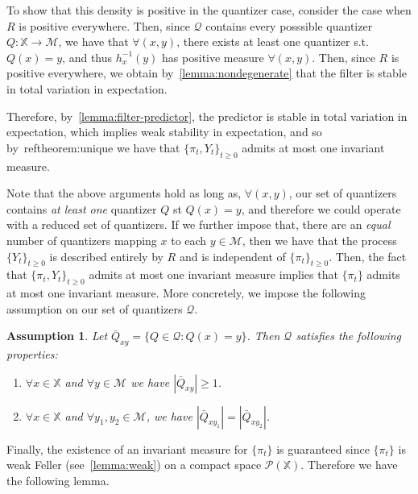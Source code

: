 \documentclass{article}
\newtheorem{assumption}{Assumption}[section]
\begin{document}
To show that this density is positive in the quantizer case, consider the case when \( R \) is positive everywhere. Then, since \( \mathcal{Q} \) contains every posssible quantizer \( Q : \mathbb{X} \to \mathcal{M} \), we have that \( \forall (x,y) \), there exists at least one quantizer s.t. \( Q(x) = y \), and thus \( h_x^{-1}(y) \) has positive measure \( \forall (x,y) \). Then, since \(R\) is positive everywhere, we obtain by~\ref{lemma:nondegenerate} that the filter is stable in total variation in expectation.

Therefore, by~\ref{lemma:filter-predictor}, the predictor is stable in total variation in expectation, which implies weak stability in expectation, and so by~ref{theorem:unique} we have that \( \{\pi_t, Y_t\}_{t\ge0} \) admits at most one invariant measure. %

Note that the above arguments hold as long as, \( \forall (x,y) \), our set of quantizers contains \emph{at least one} quantizer \( Q \) st \( Q(x) = y \), and therefore we could operate with a reduced set of quantizers. If we further impose that, there are an \emph{equal} number of quantizers mapping \(x\) to each \( y \in \mathcal{M} \), then we have that the process \( \{Y_t\}_{t\ge0} \) is described entirely by \( R \) and is independent of \( \{\pi_t\}_{t\ge0} \). Then, the fact that \( \{\pi_t, Y_t\}_{t\ge0} \) admits at most one invariant measure implies that \( \{\pi_t\} \) admits at most one invariant measure. More concretely, we impose the following assumption on our set of quantizers \( \mathcal{Q} \). %

\begin{assumption}\label{assumption:equal-bins}
    Let \( \bar{Q}_{xy} = \{Q \in \mathcal{Q} : Q(x) = y\} \). Then \( \mathcal{Q} \) satisfies the following properties:

    \begin{enumerate}
        \item[(i)] \( \forall x \in \mathbb{X} \) and \( \forall y \in \mathcal{M} \) we have \(|\bar{Q}_{xy}| \ge 1 \).
        \item[(ii)] \( \forall x \in \mathbb{X} \) and \( \forall y_1, y_2 \in \mathcal{M}\), we have \( |\bar{Q}_{xy_1}| = |\bar{Q}_{xy_2}| \).
    \end{enumerate}
\end{assumption}

Finally, the existence of an invariant measure for \( \{\pi_t\} \) is guaranteed since \( \{\pi_t\} \) is weak Feller (see~\ref{lemma:weak}) on a compact space \( \mathcal{P}(\mathbb{X}) \). Therefore we have the following lemma.
\end{document}
